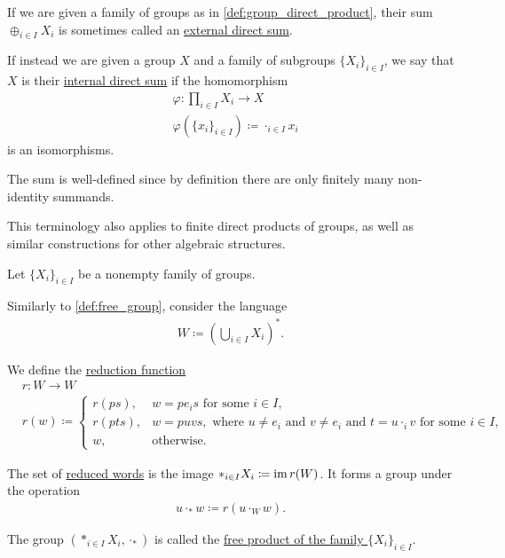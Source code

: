 \begin{note}\label{def:group_direct_sum_external_internal}\cite[126]{Knapp2016BAlg}
  If we are given a family of groups as in \cref{def:group_direct_product}, their sum $\oplus_{i \in I} X_i$ is sometimes called an \ul{external direct sum}.

  If instead we are given a group $X$ and a family of subgroups $\{ X_i \}_{i \in I}$, we say that $X$ is their \ul{internal direct sum} if the homomorphism
  \begin{align*}
    &\varphi: \prod_{i \in I} X_i \to X \\
    &\varphi(\{ x_i \}_{i \in I}) \coloneqq \cdot_{i \in I} x_i
  \end{align*}
  is an isomorphisms.

  The sum is well-defined since by definition there are only finitely many non-identity summands.

  This terminology also applies to finite direct products of groups, as well as similar constructions for other algebraic structures.
\end{note}

\begin{definition}\label{def:group_free_product}\cite[323]{Knapp2016BAlg}
  Let $\{ X_i \}_{i \in I}$ be a nonempty family of groups.

  Similarly to \cref{def:free_group}, consider the language
  \begin{align*}
    W \coloneqq \left( \bigcup_{i \in I} X_i \right)^{*}.
  \end{align*}

  We define the \ul{reduction function}
  \begin{align*}
    &r: W \to W \\
    &r(w) \coloneqq \begin{cases}
      r(ps), &w = p e_i s \text{ for some } i \in I, \\
      r(pts), &w = puvs, \text{ where } u \neq e_i \text{ and } v \neq e_i \text{ and } t = u \cdot_i v \text{ for some } i \in I, \\
      w, &\text{otherwise}.
    \end{cases}
  \end{align*}

  The set of \ul{reduced words} is the image $\ast_{i \in I} X_i \coloneqq \operatorname{im} r(W)$. It forms a group under the operation
  \begin{align*}
    u \cdot_\ast w \coloneqq r(u \cdot_{W} w).
  \end{align*}

  The group $(\ast_{i \in I} X_i, \cdot_\ast)$ is called the \ul{free product of the family $\{ X_i \}_{i \in I}$}.
\end{definition}

